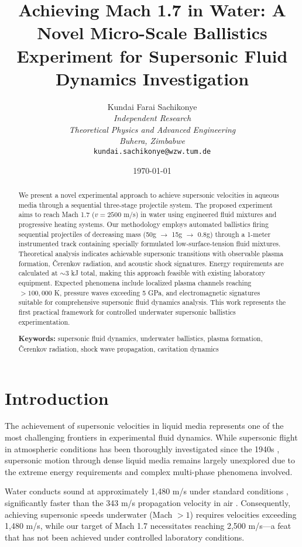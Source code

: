 \documentclass[12pt,a4paper]{article}
\title{\textbf{Achieving Mach 1.7 in Water: A Novel Micro-Scale Ballistics Experiment for Supersonic Fluid Dynamics Investigation}}
\author{
Kundai Farai Sachikonye\\
\textit{Independent Research}\\
\textit{Theoretical Physics and Advanced Engineering}\\
\textit{Buhera, Zimbabwe}\\
\texttt{kundai.sachikonye@wzw.tum.de}
}
\date{\today}
\begin{document}
\maketitle

\begin{abstract}
We present a novel experimental approach to achieve supersonic velocities in aqueous media through a sequential three-stage projectile system. The proposed experiment aims to reach Mach 1.7 ($v = 2500$ m/s) in water using engineered fluid mixtures and progressive heating systems. Our methodology employs automated ballistics firing sequential projectiles of decreasing mass (50g $\rightarrow$ 15g $\rightarrow$ 0.8g) through a 1-meter instrumented track containing specially formulated low-surface-tension fluid mixtures. Theoretical analysis indicates achievable supersonic transitions with observable plasma formation, Čerenkov radiation, and acoustic shock signatures. Energy requirements are calculated at $\sim$3 kJ total, making this approach feasible with existing laboratory equipment. Expected phenomena include localized plasma channels reaching $>100,000$ K, pressure waves exceeding 5 GPa, and electromagnetic signatures suitable for comprehensive supersonic fluid dynamics analysis. This work represents the first practical framework for controlled underwater supersonic ballistics experimentation.

\textbf{Keywords:} supersonic fluid dynamics, underwater ballistics, plasma formation, Čerenkov radiation, shock wave propagation, cavitation dynamics
\end{abstract}

\section{Introduction}

The achievement of supersonic velocities in liquid media represents one of the most challenging frontiers in experimental fluid dynamics. While supersonic flight in atmospheric conditions has been thoroughly investigated since the 1940s \cite{anderson2003fundamentals, bertin2013hypersonic}, supersonic motion through dense liquid media remains largely unexplored due to the extreme energy requirements and complex multi-phase phenomena involved.

Water conducts sound at approximately 1,480 m/s under standard conditions \cite{kinsler2000fundamentals}, significantly faster than the 343 m/s propagation velocity in air \cite{pierce2019acoustics}. Consequently, achieving supersonic speeds underwater (Mach $> 1$) requires velocities exceeding 1,480 m/s, while our target of Mach 1.7 necessitates reaching 2,500 m/s—a feat that has not been achieved under controlled laboratory conditions.
\end{document}
